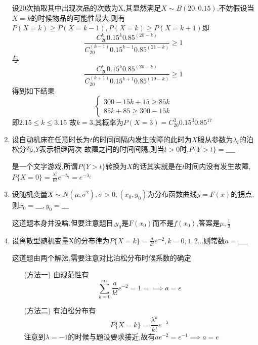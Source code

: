 \documentclass[12pt, a4paper, oneside, UTF8]{ctexbook}
\begin{document}
\begin{enumerate}
    \begin{solution}
        设20次抽取其中出现次品的次数为X,其显然满足$X\sim B(20,0.15)$,不妨假设当$X=k$的时候物品的可能性最大,则有
        $P(X=k)\geq P(X=k-1),P(X=k)\geq P(X=k+1)$即
        \[
        \frac{C_{20}^{k}0.15^{k}0.85^{(20-k)}}{C_{20}^{(k-1)}0.15^{k-1}0.85^{(21-k)}} \geq 1
        \]
        与
        \[
        \frac{C_{20}^{k}0.15^{k}0.85^{(20-k)}}{C_{20}^{(k+1)}0.15^{k+1}0.85^{(19-k)}} \geq 1
        \]
        得到如下结果
        \[
        \begin{cases}
            300-15k+15\geq 85k \\
            85k+85\geq 300-15k
        \end{cases}
        \]
        即$2.15\leq k \leq 3.15$ 故$k=3$,其概率为$P(X=3)=C_{20}^{3}0.15^{3}0.85^{17}$
    \end{solution}
    
    \item 设自动机床在任意时长为$t$的时间间隔内发生故障的此时为$X$服从参数为$\lambda_t$的泊松分布,$Y$表示相继两次
    故障之间的时间间隔,则当$t>0$时,$P\{Y>t\}=\_\_\_\_$
    \begin{solution}
        是一个文字游戏,所谓$P\{Y>t\}$转换为$X$的话其实就是在$t$时间内没有发生故障,$P\{X=0\}=\frac{\lambda_t^0}{0!}e^{-\lambda_t}=e^{-\lambda_t}$
    \end{solution}

    \item 设随机变量$X\sim N(\mu,\sigma^2),\sigma>0,(x_0,y_0)$为分布函数曲线$y=F(x)$的拐点,则$x_0=\_\_\_,y_0=\_\_\_$ 
    
    \begin{solution}
        这道题本身并没啥,但要注意题目,$y_0$是$F(x_0)$而不是$f(x_0)$,答案是$\mu,\frac{1}{2}$
    \end{solution}

    \item 设离散型随机变量X的分布律为$P\{X=k\}=\frac{a}{k!}e^{-2},k=0,1,2\ldots$则常数$a=\_\_\_\_$ 
    
    \begin{solution}
        这道题由两个解法,需要注意对比泊松分布时候系数的确定 
        \begin{enumerate}
            \item [(方法一)] 由规范性有 
            \[
            \sum_{k=0}^{\infty}\frac{a}{k!}e^{-2} = 1 =\implies a = e
            \]
            \item [(方法二)] 有泊松分布有
            \[
            P\{X=k\}=\frac{\lambda^k}{k!}e^{-\lambda} 
            \]
            注意到$\lambda=-1$的时候与题设要求接近,故有$ae^{-2}=e^{-1}\implies a = e$
        \end{enumerate}
    \end{solution}


\end{enumerate}
\end{document}
